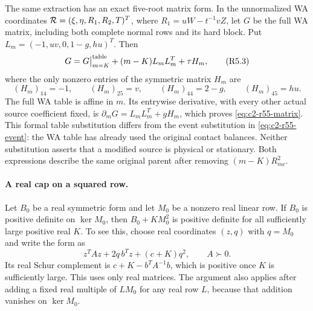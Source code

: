 The same extraction has an exact five-root matrix form. In the
unnormalized WA coordinates
${\cal R}=(\xi,\eta,R_1,R_2,T)^T$, where $R_1=uW-t^{-1}vZ$,
let $G$ be the full WA matrix, including both complete normal rows
and its hard block. Put $L_m=(-1,uv,0,1-g,hu)^T$. Then
\begin{equation}
 G=G\big|^{\rm table}_{m=K}+(m-K)L_mL_m^T+\tau H_m,
 \tag{R5.3}\label{eq:c2-r55-matrix}
\end{equation}
where the only nonzero entries of the symmetric matrix $H_m$ are
\begin{equation}
 (H_m)_{14}=-1,\qquad (H_m)_{25}=v,\qquad
 (H_m)_{44}=2-g,\qquad (H_m)_{45}=hu.
 \tag{R5.4}\label{eq:c2-r55-correction}
\end{equation}
The full WA table is affine in $m$. Its entrywise derivative, with
every other actual source coefficient fixed, is
$\partial_mG=L_mL_m^T+gH_m$, which proves
\eqref{eq:c2-r55-matrix}. This formal table substitution differs
from the event substitution in \eqref{eq:c2-r55-event}: the WA table
has already used the original contact balances. Neither substitution
asserts that a modified source is physical or stationary. Both
expressions describe the same original parent after removing
$(m-K)R_{mc}^2$.

\paragraph{A real cap on a squared row.}
\label{lem:c2-r55-real-cap}
Let $B_0$ be a real symmetric form and let $M_0$ be a nonzero real
linear row. If $B_0$ is positive definite on $\ker M_0$, then
$B_0+KM_0^2$ is positive definite for all sufficiently large positive
real $K$. To see this, choose real coordinates $(z,q)$ with
$q=M_0$ and write the form as
\begin{equation}
 z^TAz+2q\,b^Tz+(c+K)q^2,\qquad A\succ0.
 \label{eq:c2-r55-real-cap}
\end{equation}
Its real Schur complement is $c+K-b^TA^{-1}b$, which is positive
once $K$ is sufficiently large. This uses only real matrices. The
argument also applies after adding a fixed real multiple of $LM_0$
for any real row $L$, because that addition vanishes on $\ker M_0$.

